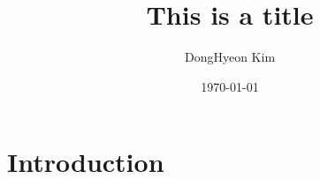 \documentclass{report}
\title{This is a title}
\author[1]{DongHyeon Kim}
\affil[1]{Future cryptography Design Lab, Kookmin University, Korea}
\date{\today}
\begin{document}
\maketitle
\tableofcontents

\chapter{Introduction}
\end{document}
